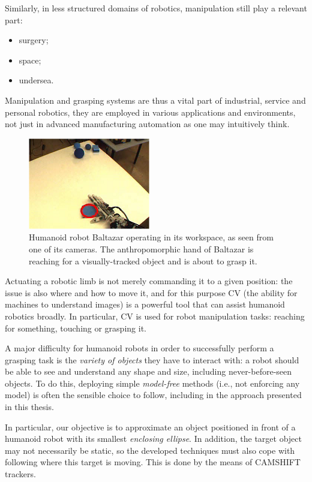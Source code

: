 Similarly, in less structured domains of robotics, manipulation still play a relevant part:
\begin{itemize}
\item surgery;

\item space;

\item undersea.
\end{itemize}

Manipulation and grasping systems are thus a vital part of industrial, service and personal robotics, they are employed in various applications and environments, not just in advanced manufacturing automation as one may intuitively think.

\begin{figure}
\centering
\includegraphics{figures/balta_grasping}
\caption[Baltazar humanoid robot and its workspace]{Humanoid robot Baltazar operating in its workspace, as seen from one of its cameras. The anthropomorphic hand of Baltazar is reaching for a visually-tracked object and is about to grasp it.}
\label{img:balta_grasping}
\end{figure}

Actuating a robotic limb is not merely commanding it to a given position: the issue is also where and how to move it, and for this purpose \ac{CV} (the ability for machines to understand images) is a powerful tool that can assist humanoid robotics broadly. In particular, \ac{CV} is used for robot manipulation tasks: reaching for something, touching or grasping it.

A major difficulty for humanoid robots in order to successfully perform a grasping task is the \emph{variety of objects} they have to interact with: a robot should be able to see and understand any shape and size, including never-before-seen objects. To do this, deploying simple \emph{model-free} methods (i.e., not enforcing any model) is often the sensible choice to follow, including in the approach presented in this thesis.

In particular, our objective is to approximate an object positioned in front of a humanoid robot with its smallest \emph{enclosing ellipse}. In addition, the target object may not necessarily be static, so the developed techniques must also cope with following where this target is moving. This is done by the means of \ac{CAMSHIFT} trackers.

